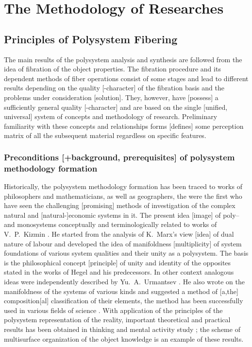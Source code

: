 \documentclass[12pt,leqno]{book}
\begin{document}
\part{The Methodology of Researches}
\chapter{Principles of Polysystem Fibering}
The main results of the polysystem analysis and synthesis are followed from the idea of fibration of the object properties. The fibration procedure and its dependent methods of fiber operations consist of some stages and lead to different results depending on the quality [-character] of the fibration basis and the problems under consideration [solution]. They, however, have [possess] a sufficiently general quality [-character] and are based on the single [unified, universal] system of concepts and methodology of research. Preliminary familiarity with these concepts and relationships forms [defines] some perception matrix of all the subsequent material regardless on specific features.

\section{Preconditions [+background, prerequisites] of polysystem methodology formation}

Historically, the polysystem methodology formation has been traced to works of philosophers and mathematicians, as well as geographers, the were the first who have seen the challenging [promising] methods of investigation of the complex natural and [natural-]economic systems in it. The present idea [image] of poly-- and monosystems conceptually and terminologically related to works of V.~P.~Kizmin \cite{b232,b233}. He started from the analysis of K.~Marx's view [idea] of dual nature of labour and developed the idea of manifoldness [multiplicity] of system foundations of various system qualities and their unity as a polysystem. The basis is the philosophical concept [principle] of unity and identity of the opposites stated in the works of Hegel and his predecessors. In other context analogous ideas were independently described by Yu.~A.~Urmantsev \cite{b428,b429,b432}. He also wrote on the manifoldness of the systems of various kinds and suggested a method of [a,the] composition[al] classification of their elements, the method has been successfully used in various fields of science \cite{b381}. With application of the principles of the polysystem representation of the reality, important theoretical and practical results has been obtained in thinking and mental activity study \cite{b101,b512}; the scheme of multisurface organization of the object knowledge is an example of these results.
\end{document}
